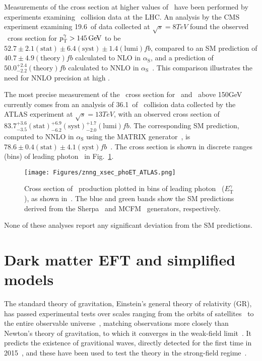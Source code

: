 Measurements of the cross section at higher values of \pTgamma\ have been performed by experiments examining \Pp\Pp\ collision data at the LHC.
An analysis by the CMS experiment examining 19.6\fbinv\ of data collected at $\sqrt{s} = 8\unit{TeV}$ found the observed \zinvg\ cross section for $\pTgamma > 145\unit{GeV}$ to be
$52.7 \pm 2.1\mathrm{(stat)} \pm 6.4\mathrm{(syst)} \pm 1.4\mathrm{(lumi)}\unit{fb}$, compared to an SM prediction of $40.7 \pm 4.9\mathrm{(theory)}\unit{fb}$ calculated to NLO in $\alpha_\mathrm{S}$, and
a prediction of $50.0^{+2.4}_{-2.2}\mathrm{(theory)}\unit{fb}$ calculated to NNLO in $\alpha_\mathrm{S}$~\cite{ref:j.physletb.2016.06.080}. This comparison illustrates the need for NNLO precision at high \pTgamma.

The most precise measurement of the \zinvg\ cross section for \pTgamma\ and \MET\ above 150\unit{GeV} currently comes from an analysis of 36.1\fbinv\ of \Pp\Pp\ collision data
collected by the ATLAS experiment at $\sqrt{s} = 13\unit{TeV}$, with an observed cross section of $83.7^{+3.6}_{-3.5}\mathrm{(stat)}^{+6.9}_{-6.2}\mathrm{(syst)}^{+1.7}_{-2.0}\mathrm{(lumi)}\unit{fb}$.
The corresponding SM prediction, computed to NNLO in $\alpha_\mathrm{S}$ using the MATRIX generator~\cite{ref:epjc/s10052-018-5771-7}, is $78.6 \pm 0.4\mathrm{(stat)} \pm 4.1\mathrm{(syst)}\unit{fb}$~\cite{ref:CERN-EP-2018-220}.
The cross section is shown in discrete ranges (bins) of leading photon \pT\ in Fig.~\ref{fig:znng_xsec_phoET_ATLAS}.

\begin{figure}[hbtp]
  \begin{center}
    \texttt{[image: Figures/znng\_xsec\_phoET\_ATLAS.png]}
    \caption{
      Cross section of \zinvg\ production plotted in bins of leading photon \pT\ ($E^{\gamma}_\mathrm{T}$), as shown in~\cite{ref:CERN-EP-2018-220}.
      The blue and green bands show the SM predictions derived from the Sherpa~\cite{ref:1126-6708/2009/02/007} and MCFM~\cite{ref:JHEP07(2011)018} generators, respectively.
    }
    \label{fig:znng_xsec_phoET_ATLAS}
  \end{center}
\end{figure}

None of these analyses report any significant deviation from the SM predictions.

\section{Dark matter EFT and simplified models} \label{sec:introduction_dm}
The standard theory of gravitation, Einstein's
general theory of relativity (GR), has passed experimental tests over scales ranging from the orbits of satellites~\cite{ref:lrr-2003-1} to the entire observable universe~\cite{ref:planck2018_cosparams},
matching observations more closely than Newton's theory of gravitation, to which it converges in the weak-field limit~\cite{ref:WaldGR}.
It predicts the existence of gravitional waves, directly detected for the first time in 2015~\cite{ref:PhysRevLett.116.061102}, and these have been used to test the theory in the strong-field regime~\cite{ref:PhysRevLett.116.221101}.


